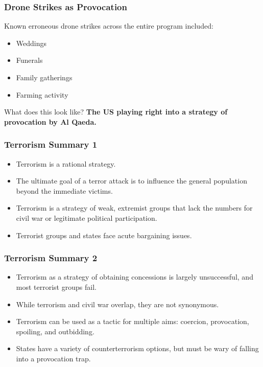 \documentclass[handout]{beamer}
\begin{document}
\begin{frame} 
	\frametitle{\LARGE{Drone Strikes as Provocation}}
Known erroneous drone strikes across the entire program included: \pause
	\begin{itemize}
		\item Weddings \pause
		\item Funerals \pause
		\item Family gatherings \pause
		\item Farming activity \pause
	\end{itemize}
What does this look like? \textbf{The US playing right into a strategy of provocation by Al Qaeda.}
\end{frame}

\begin{frame} 
	\frametitle{\LARGE{Terrorism Summary 1}}
	\begin{itemize}
		\item Terrorism is a rational strategy. \pause
		\item The ultimate goal of a terror attack is to influence the general population beyond the immediate victims. \pause
		\item Terrorism is a strategy of weak, extremist groups that lack the numbers for civil war or legitimate political participation. \pause 
		\item Terrorist groups and states face acute bargaining issues.
	\end{itemize}
\end{frame}

\begin{frame} 
	\frametitle{\LARGE{Terrorism Summary 2}}
	\begin{itemize}
		\item Terrorism as a strategy of obtaining concessions is largely unsuccessful, and most terrorist groups fail. \pause
		\item While terrorism and civil war overlap, they are not synonymous.
		\item Terrorism can be used as a tactic for multiple aims: coercion, provocation, spoiling, and outbidding. \pause
		\item States have a variety of counterterrorism options, but must be wary of falling into a provocation trap.
	\end{itemize}
\end{frame}
\end{document}

